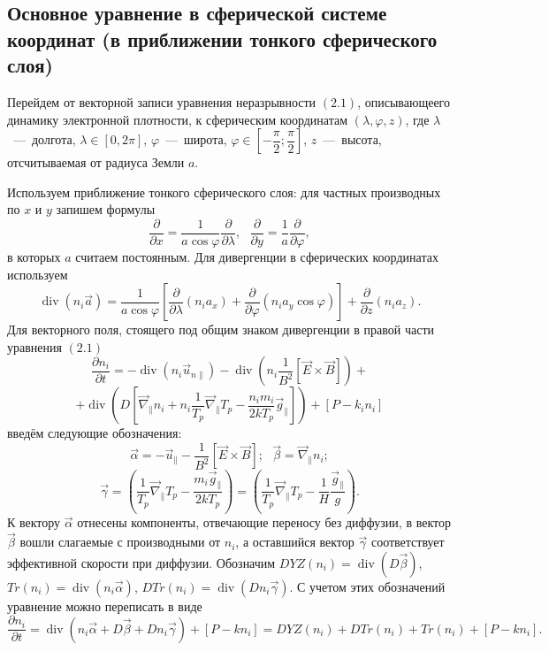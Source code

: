 \documentclass[14pt, a4paper, fleqn]{extarticle}
\renewcommand{\div}{\operatorname{div}}
\begin{document}
\subsection{Основное уравнение в сферической системе координат (в приближении тонкого сферического слоя)}

Перейдем от векторной записи уравнения неразрывности $(2.1)$, описывающеего динамику электронной плотности, к сферическим координатам $(\lambda, \varphi, z)$, где $\lambda$~---~долгота, $\lambda \in [0, 2\pi]$, $\varphi$~---~широта, $\varphi \in \left[-\dfrac{\pi}{2};\dfrac{\pi}{2}\right]$, $z$~---~высота, отсчитываемая от радиуса Земли $a$. 

Используем приближение тонкого сферического слоя: для частных производных по $x$ и $y$ запишем формулы $$\dfrac{\partial}{\partial x}=\dfrac{1}{a\cos\varphi}\dfrac{\partial}{\partial\lambda},\mbox{ } \dfrac{\partial}{\partial y} = \dfrac{1}{a}\dfrac{\partial}{\partial\varphi},$$ в которых $a$ считаем постоянным. Для дивергенции в сферических координатах используем $$\div(n_i \vec{a}) = \dfrac{1}{a\cos\varphi}\left[\dfrac{\partial}{\partial\lambda}(n_i a_x)+\dfrac{\partial}{\partial\varphi}(n_i a_y\cos\varphi)\right]+\dfrac{\partial}{\partial z}(n_i a_z).$$
Для векторного поля, стоящего под общим знаком дивергенции в правой части уравнения $(2.1)$ $$\dfrac{\partial n_i}{\partial t} = -\div(n_i \vec{u}_{n\parallel})-\div\left(n_i\dfrac{1}{B^2}[\vec{E}\times \vec{B}] \right)+$$ $$+\div\left(D\left[\vec{\nabla}_\parallel n_i +n_i\dfrac{1}{T_p}\vec{\nabla}_\parallel T_p - \dfrac{n_i m_i}{2kT_p}\vec{g}_\parallel\right]\right)+[P-k_in_i]$$ введём следующие обозначения: $$\vec{\alpha}=-\vec{u}_\parallel-\dfrac{1}{B^2}[\vec{E}\times\vec{B}]; \mbox{ }\vec{\beta} = \vec{\nabla}_\parallel n_i;$$ $$\vec{\gamma} = \left(\dfrac{1}{T_p}\vec{\nabla}_\parallel  T_p - \dfrac{m_i \vec{g}_\parallel}{2kT_p}\right)=\left(\dfrac{1}{T_p}\vec{\nabla}_\parallel  T_p - \dfrac{1}{H}\dfrac{\vec{g}_\parallel}{g}\right).$$
К вектору $\vec{\alpha}$ отнесены компоненты, отвечающие переносу без диффузии, в вектор $\vec{\beta}$ вошли слагаемые с производными от $n_i$, а оставшийся вектор $\vec{\gamma}$ соответствует эффективной скорости при диффузии. Обозначим $DYZ(n_i) = \div(D\vec{\beta})$, $Tr(n_i) = \div(n_i\vec{\alpha})$, $DTr(n_i) = \div(Dn_i\vec{\gamma})$. С учетом этих обозначений уравнение можно переписать в виде $$\dfrac{\partial n_i}{\partial t} = \div(n_i\vec{\alpha} + D\vec{\beta}+Dn_i\vec{\gamma})+[P-kn_i]=DYZ(n_i)+DTr(n_i)+Tr(n_i)+[P-kn_i].$$
\end{document}
